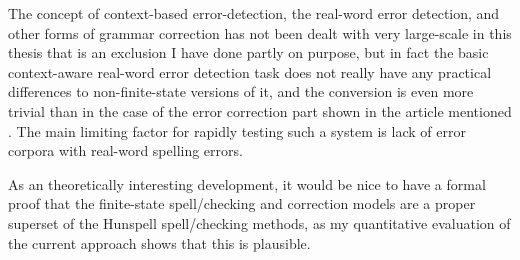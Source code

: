 \documentclass[officiallayout]{unihelcompling}
\begin{document}
The concept of context-based error-detection, the real-word error detection,
and other forms of grammar correction has not been dealt with very large-scale
in this thesis that is an exclusion I have done partly on purpose, but in
fact the basic context-aware real-word error detection task does not really
have any practical differences to non-finite-state versions of it, and the
conversion is even more trivial than in the case of the error correction part
shown in the article mentioned . The main
limiting factor for rapidly testing such a system is lack of error corpora
with real-word spelling errors.

As an theoretically interesting development, it would be nice to have a formal
proof that the finite-state spell\-/checking and correction models are a proper
superset of the Hunspell spell\-/checking methods, as my quantitative
evaluation of the current approach shows that this is plausible.



\end{document}
